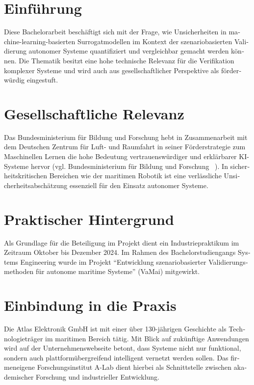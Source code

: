 \begin{otherlanguage}{ngerman}
\section{Einführung}

Diese Bachelorarbeit beschäftigt sich mit der Frage, wie Unsicherheiten in machine-learning-basierten Surrogatmodellen im Kontext der szenariobasierten Validierung autonomer Systeme quantifiziert und vergleichbar gemacht werden können. Die Thematik besitzt eine hohe technische Relevanz für die Verifikation komplexer Systeme und wird auch aus gesellschaftlicher Perspektive als förderwürdig eingestuft.

\section{Gesellschaftliche Relevanz}

Das \gls{Bundesministerium für Bildung und Forschung} hebt in Zusammenarbeit mit dem \gls{Deutschen Zentrum für Luft- und Raumfahrt} in seiner Förderstrategie zum Maschinellen Lernen die hohe Bedeutung vertrauenswürdiger und erklärbarer KI-Systeme hervor (vgl. Bundesministerium für Bildung und Forschung ~\parencite{bmbf2025}). In sicherheitskritischen Bereichen wie der maritimen Robotik ist eine verlässliche Unsicherheitsabschätzung essenziell für den Einsatz autonomer Systeme.

\section{Praktischer Hintergrund}

Als Grundlage für die Beteiligung im Projekt dient ein Industriepraktikum im Zeitraum Oktober bis Dezember 2024. Im Rahmen des Bachelorstudiengangs Systems Engineering wurde im Projekt \enquote{Entwicklung szenariobasierter Validierungsmethoden für autonome maritime Systeme} (VaMai) mitgewirkt. 

\section{Einbindung in die Praxis}

Die Atlas Elektronik GmbH ist mit einer über 130-jährigen Geschichte als Technologieträger im maritimen Bereich tätig. Mit Blick auf zukünftige Anwendungen wird auf der Unternehmenswebseite betont, dass Systeme nicht nur funktional, sondern auch plattformübergreifend intelligent vernetzt werden sollen. Das firmeneigene Forschungsinstitut A-Lab dient hierbei als Schnittstelle zwischen akademischer Forschung und industrieller Entwicklung.


\end{otherlanguage}
